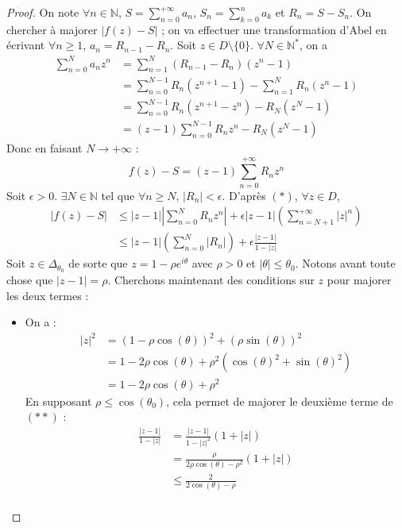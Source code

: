 	\begin{proof}
		On note $\forall n \in \mathbb{N}$, $S = \sum_{n=0}^{+\infty} a_n$, $S_n = \sum_{k=0}^n a_k$ et $R_n = S - S_n$. On chercher à majorer $|f(z) - S|$ ; on va effectuer une transformation d'Abel en écrivant $\forall n \geq 1$, $a_n = R_{n-1} - R_n$. Soit $z \in D \setminus \{ 0 \}$. $\forall N \in \mathbb{N}^*$, on a
		\begin{align*}
			\sum_{n=0}^N a_n z^n &= \sum_{n=1}^N (R_{n-1} - R_n)(z^n - 1) \\
			&= \sum_{n=0}^{N-1} R_n(z^{n+1} - 1) - \sum_{n=1}^N R_n(z^n - 1) \\
			&= \sum_{n=0}^{N-1} R_n(z^{n+1} - z^n) - R_N(z^N - 1) \\
			&= (z-1) \sum_{n=0}^{N-1} R_nz^n - R_N(z^N - 1)
		\end{align*}
		Donc en faisant $N \rightarrow +\infty$ :
		\[ f(z) - S = (z-1) \sum_{n=0}^{+\infty} R_nz^n \tag{$*$} \]
		Soit $\epsilon > 0$. $\exists N \in \mathbb{N}$ tel que $\forall n \geq N$, $|R_n| < \epsilon$. D'après $(*)$, $\forall z \in D$,
		\begin{align*}
			|f(z)-S| &\leq |z-1| \left| \sum_{n=0}^N R_n z^n \right| + \epsilon |z-1| \left( \sum_{n=N+1}^{+\infty} |z|^n \right) \\
			&\leq |z-1| \left( \sum_{n=0}^N |R_n| \right) + \epsilon \frac{|z-1|}{1-|z|} \tag{$**$}
		\end{align*}
		Soit $z \in \Delta_{\theta_0}$ de sorte que $z = 1-\rho e^{i\theta}$ avec $\rho > 0$ et $|\theta| \leq \theta_0$. Notons avant toute chose que $|z-1| = \rho$. Cherchons maintenant des conditions sur $z$ pour majorer les deux termes :
		\begin{itemize}
			\item On a :
			\begin{align*}
				|z|^2 &= (1 - \rho \cos(\theta))^2 + (\rho \sin(\theta))^2 \\
				&= 1 - 2 \rho \cos(\theta) + \rho^2 (\cos(\theta)^2 + \sin(\theta)^2) \\
				&= 1 - 2 \rho \cos(\theta) + \rho^2
			\end{align*}
			En supposant $\rho \leq \cos(\theta_0)$, cela permet de majorer le deuxième terme de $(**)$ :
			\begin{align*}
				\frac{|z-1|}{1-|z|} &= \frac{|z-1|}{1-|z|^2}(1+|z|) \\
				&= \frac{\rho}{2 \rho \cos(\theta) - \rho^2}(1+|z|) \\
				&\leq \frac{2}{2\cos(\theta) - \rho} \\

\end{align*}
\end{itemize}
\end{proof}
